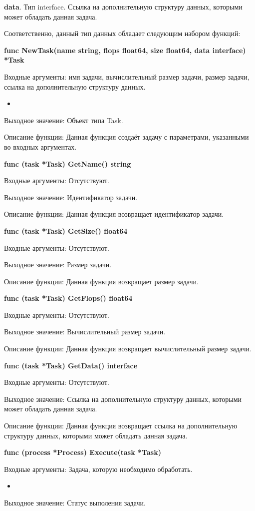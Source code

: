 \textbf{	data}. Тип interface{}. Ссылка на дополнительную структуру данных, которыми может обладать данная задача. 

Соответственно, данный тип данных обладает следующим набором функций:

\textbf{func NewTask(name string, flops float64, size float64, data interface{}) *Task}

Входные аргументы: имя задачи, вычислительный размер задачи, размер задачи, ссылка на дополнительную структуру данных.
\begin{itemize}
	\item 
\end{itemize}
Выходное значение: Объект типа Task.

Описание функции: Данная функция создаёт задачу с параметрами, указанными во входных аргументах.

\textbf{	func (task *Task) GetName() string }

Входные аргументы: Отсутствуют.

Выходное значение: Идентификатор задачи. 

Описание функции: Данная функция возвращает идентификатор задачи.

\textbf{	func (task *Task) GetSize() float64 }

Входные аргументы: Отсутствуют.

Выходное значение: Размер задачи.

Описание функции: Данная функция возвращает размер задачи.

\textbf{	func (task *Task) GetFlops() float64}

Входные аргументы: Отсутствуют.

Выходное значение: Вычислительный размер задачи.

Описание функции: Данная функция возвращает вычислительный размер задачи.

\textbf{	func (task *Task) GetData() interface{} }

Входные аргументы: Отсутствуют.

Выходное значение: Ссылка на дополнительную структуру данных, которыми может обладать данная задача.

Описание функции: Данная функция возвращает ссылка на дополнительную структуру данных, которыми может обладать данная задача.

\textbf{	func (process *Process) Execute(task *Task) }

Входные аргументы: Задача, которую необходимо обработать.
\begin{itemize}
	\item 
\end{itemize}
Выходное значение: Статус выполения задачи.

